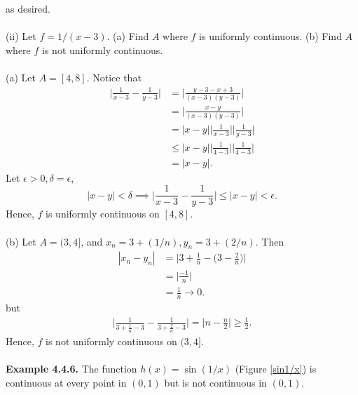 \documentclass{article}
\begin{document}
            as desired.
            \\ \\
            (ii) Let $f = 1/(x-3)$. (a) Find $A$ where $f$ is uniformly continuous. (b) Find $A$ where $f$ is not uniformly continuous.
            \\ \\
            (a) Let $A=[4,8]$. Notice that
            \begin{align*}
                \bigg|\frac{1}{x-3}-\frac{1}{y-3}\bigg| & = \bigg|\frac{y-3-x+3}{(x-3)(y-3)}\bigg| \\
                & = \bigg|\frac{x-y}{(x-3)(y-3)}\bigg| \\
                & = |x-y|\bigg|\frac{1}{x-3}\bigg|\bigg|\frac{1}{y-3}\bigg| \\
                & \leq |x-y|\bigg|\frac{1}{4-3}\bigg|\bigg|\frac{1}{4-3}\bigg| \\
                & = |x-y|.
            \end{align*}
            Let $\epsilon >0, \delta=\epsilon$,
            \begin{equation*}
                |x-y|<\delta \implies \bigg|\frac{1}{x-3}-\frac{1}{y-3}\bigg| \leq |x-y| < \epsilon.
            \end{equation*}
            Hence, $f$ is uniformly continuous on $[4,8]$.
            \\ \\
            (b) Let $A = (3,4]$, and $x_n=3+(1/n), y_n=3+(2/n)$. Then
            \begin{align*}
                |x_n-y_n| &= \bigg|3+\frac{1}{n}-\bigg(3-\frac{2}{n}\bigg)\bigg| \\
                &= \bigg|\frac{-1}{n}\bigg| \\
                & = \frac{1}{n} \to 0.
            \end{align*}
            but
            \begin{align*}
                \bigg|\frac{1}{3+\frac{1}{n}-3} - \frac{1}{3+\frac{2}{n}-3}\bigg| = \bigg|n-\frac{n}{2}\bigg| \geq \frac{1}{2}.
            \end{align*}
            Hence, $f$ is not uniformly continuous on $(3,4]$.
            \\ \\
            \textbf{Example 4.4.6.} The function $h(x)=\sin(1/x)$ (Figure \ref{sin1/x}) is continuous at every point in $(0,1)$ but is not continuous in $(0,1)$. 
            \\ \\
\end{document}
